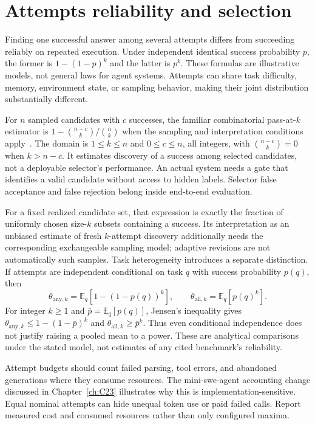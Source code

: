 \section{Attempts reliability and selection}\label{sec:C26:attempts}
Finding one successful answer among several attempts differs from succeeding reliably on repeated execution. Under independent identical success probability $p$, the former is $1-(1-p)^k$ and the latter is $p^k$. These formulas are illustrative models, not general laws for agent systems. Attempts can share task difficulty, memory, environment state, or sampling behavior, making their joint distribution substantially different.

For $n$ sampled candidates with $c$ successes, the familiar combinatorial pass-at-$k$ estimator is $1-\binom{n-c}{k}/\binom{n}{k}$ when the sampling and interpretation conditions apply~\cite{chen2021codeeval}. The domain is $1\leq k\leq n$ and $0\leq c\leq n$, all integers, with $\binom{n-c}{k}=0$ when $k>n-c$. It estimates discovery of a success among selected candidates, not a deployable selector's performance. An actual system needs a gate that identifies a valid candidate without access to hidden labels. Selector false acceptance and false rejection belong inside end-to-end evaluation.

For a fixed realized candidate set, that expression is exactly the fraction of uniformly chosen size-$k$ subsets containing a success. Its interpretation as an unbiased estimate of fresh $k$-attempt discovery additionally needs the corresponding exchangeable sampling model; adaptive revisions are not automatically such samples. Task heterogeneity introduces a separate distinction. If attempts are independent conditional on task $q$ with success probability $p(q)$, then
\begin{equation}
 \theta_{\mathrm{any},k}=\mathbb E_q[1-(1-p(q))^k],\qquad
 \theta_{\mathrm{all},k}=\mathbb E_q[p(q)^k].
\end{equation}
For integer $k\geq1$ and $\bar p=\mathbb E_q[p(q)]$, Jensen's inequality gives $\theta_{\mathrm{any},k}\leq1-(1-\bar p)^k$ and $\theta_{\mathrm{all},k}\geq\bar p^k$. Thus even conditional independence does not justify raising a pooled mean to a power. These are analytical comparisons under the stated model, not estimates of any cited benchmark's reliability.

Attempt budgets should count failed parsing, tool errors, and abandoned generations where they consume resources. The mini-swe-agent accounting change discussed in Chapter~\ref{ch:C23} illustrates why this is implementation-sensitive. Equal nominal attempts can hide unequal token use or paid failed calls. Report measured cost and consumed resources rather than only configured maxima.

